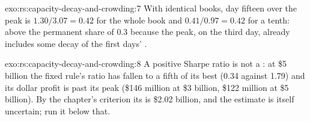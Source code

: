 \begin{solution}{exo:rs:capacity-decay-and-crowding:7}
With identical books, day fifteen over the peak is $1.30/3.07 = 0.42$ for the whole book and $0.41/0.97 = 0.42$ for a tenth: above the permanent share of 0.3
because the peak, on the third day, already includes some decay of the first days' .
\end{solution}

\begin{solution}{exo:rs:capacity-decay-and-crowding:8}
A positive Sharpe ratio is not a : at \$5 billion the fixed rule's ratio has fallen to a fifth of its best (0.34 against 1.79) and its dollar profit is
past its peak (\$146 million at \$3 billion, \$122 million at \$5 billion). By the chapter's criterion its  is \$2.02 billion, and the estimate is itself
uncertain; run it below that.
\end{solution}

